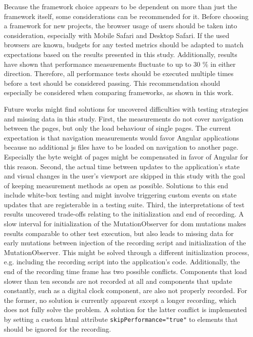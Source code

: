 \documentclass[a4paper, 12pt]{article}
\begin{document}
Because the framework choice appears to be dependent on more than just the framework itself, some considerations can be recommended for it.
Before choosing a framework for new projects, the browser usage of users should be taken into consideration, especially with Mobile Safari and Desktop Safari.
If the used browsers are known, budgets for any tested metrics should be adapted to match expectations based on the results presented in this study.
Additionally, results have shown that performance measurements fluctuate to up to 30 \% in either direction.
Therefore, all performance tests should be executed multiple times before a test should be considered passing.
This recommendation should especially be considered when comparing frameworks, as shown in this work.

Future works might find solutions for uncovered difficulties with testing strategies and missing data in this study.
First, the measurements do not cover navigation between the pages, but only the load behaviour of single pages.
The current expectation is that navigation measurements would favor Angular applications because no additional \acrlong{js} files have to be loaded on navigation to another page.
Especially the byte weight of pages might be compensated in favor of Angular for this reason.
Second, the actual time between updates to the application's state and visual changes in the user's viewport are skipped in this study with the goal of keeping measurement methods as open as possible.
Solutions to this end include white-box testing and might involve triggering custom events on state updates that are registerable in a testing suite.
Third, the interpretations of test results uncovered trade-offs relating to the initialization and end of recording.
A slow interval for initialization of the MutationObserver for \acrshort{dom} mutations makes results comparable to other test execution, but also leads to missing data for early mutations between injection of the recording script and initialization of the MutationObserver.
This might be solved through a different initialization process, e.g. including the recording script into the application's code.
Additionally, the end of the recording time frame has two possible conflicts.
Components that load slower than ten seconds are not recorded at all and components that update constantly, such as a digital clock component, are also not properly recorded.
For the former, no solution is currently apparent except a longer recording, which does not fully solve the problem.
A solution for the latter conflict is implemented by setting a custom \acrshort{html} attribute \verb|skipPerformance="true"| to elements that should be ignored for the recording.
\end{document}

